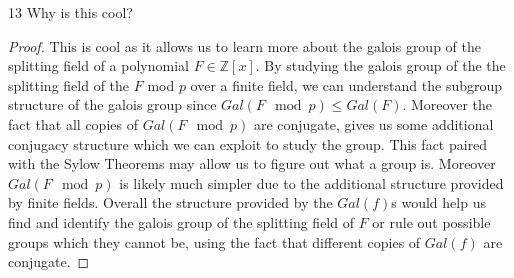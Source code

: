\documentclass{article}
\newcommand{\Z}{\mathbb{Z}}
\begin{document}
\bigskip

\begin{PROB}{13}\label{Problem 13.}
    Why is this cool?
\end{PROB}
\begin{proof}
    This is cool as it allows us to learn more about the galois group of the splitting field of a polynomial $F \in \Z[x]$. By studying the galois group of the the splitting field of the $F$ mod $p$ over a finite field, we can understand the subgroup structure of the galois group since $Gal(F \mod p ) \leq Gal(F)$. Moreover the fact that all copies of $Gal(F \mod p)$ are conjugate, gives us some additional conjugacy structure which we can exploit to study the group. This fact paired with the Sylow Theorems may allow us to figure out what a group is. Moreover $Gal(F \mod p)$ is likely much simpler due to the additional structure provided by finite fields. Overall the structure provided by the $Gal(f)$s would help us find and identify the galois group of the splitting field of $F$ or rule out possible groups which they cannot be, using the fact that different copies of $Gal(f)$ are conjugate.      
\end{proof}
\end{document}
